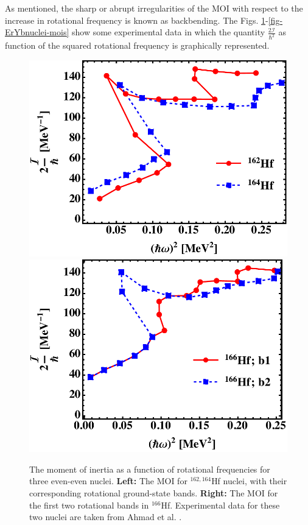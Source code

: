 As mentioned, the sharp or abrupt irregularities of the MOI with respect to the increase in rotational frequency is known as backbending. The Figs. \ref{fig-hfNuclei-mois}-\ref{fig-ErYbnuclei-mois} show some experimental data in which the quantity $\frac{2\mathcal{I}}{\hbar^2}$ as function of the squared rotational frequency is graphically represented.

\begin{figure}
    \centering
    \includegraphics[scale=0.51]{Chapters/Figures/mois_Hf162-164.pdf}
    \includegraphics[scale=0.52]{Chapters/Figures/mois_Hf166.pdf}
    \caption{The moment of inertia as a function of rotational frequencies for three even-even nuclei. \textbf{Left:} The MOI for $^{162,164}$Hf nuclei, with their corresponding rotational ground-state bands. \textbf{Right:} The MOI for the first two rotational bands in $^{166}$Hf. Experimental data for these two nuclei are taken from Ahmad et al. \cite{ahmad2021backbending}.}
    \label{fig-hfNuclei-mois}
\end{figure}

